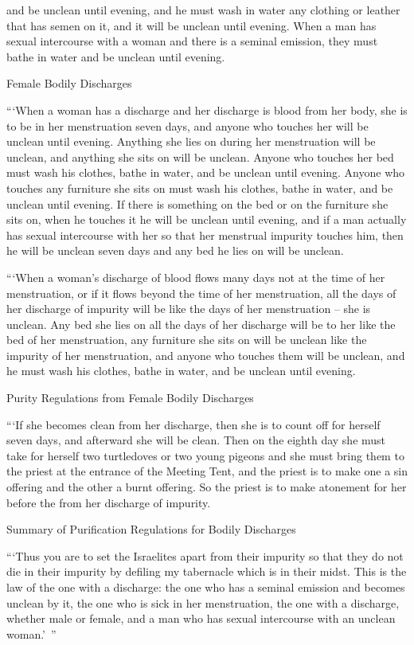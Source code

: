 {and be unclean
until
evening,
and he must wash
in water
any
clothing
or leather
that
has semen
on it,
and it will be unclean
until
evening.
When a man
has sexual intercourse
with
a woman
and there is a seminal
emission,
they must bathe
in water
and be unclean
until
evening.
\par }{\SH Female Bodily Discharges
\par }{\PP {}“‘When
a woman
has a discharge
and her discharge
is blood
from her body,
she is to be
in her menstruation
seven
days,
and anyone
who touches
her will be unclean
until
evening.
Anything
she lies
on
during her menstruation
will be unclean,
and anything
she sits
on
will be unclean.
Anyone
who touches
her bed
must wash
his clothes,
bathe
in water,
and be unclean
until
evening.
Anyone
who touches
any
furniture
she sits
on
must wash
his clothes,
bathe
in water,
and be unclean
until
evening.
If
there is something on
the bed
or
on
the furniture
she
sits
on,
when he touches
it he will be unclean
until
evening,
and if
a man
actually
has sexual
intercourse with
her so that her menstrual
impurity touches him, then
he will be unclean
seven
days
and any
bed
he lies
on
will be unclean.
\par }{\PP {}“‘When
a woman’s
discharge
of blood
flows
many
days
not
at the time
of her menstruation,
or
if
it flows
beyond the time of her menstruation,
all
the days
of her discharge
of impurity
will be like
the days
of her menstruation
– she is
unclean.
Any
bed
she lies
on
all
the days
of her discharge
will be
to her like the bed
of her menstruation,
any
furniture
she sits
on
will be
unclean
like the impurity
of her menstruation,
and anyone
who touches
them will be unclean,
and he must wash
his clothes,
bathe
in water,
and be unclean
until
evening.
\par }{\SH Purity Regulations from Female Bodily Discharges
\par }{\PP {}“‘If
she becomes clean
from her discharge,
then she is to count
off for herself seven
days,
and afterward
she will be clean.
Then on the eighth
day
she must take
for herself two
turtledoves
or
two
young
pigeons
and she must bring
them to
the priest
at
the entrance
of the Meeting
Tent,
and the priest
is to make
one
a sin offering
and the
other
a burnt offering.
So the priest
is to make atonement
for her before
the
{}
from her discharge
of impurity.
\par }{\SH Summary of Purification Regulations for Bodily Discharges
\par }{\PP {}“‘Thus
you are to set the
Israelites
apart from their impurity
so that they do not
die
in their impurity
by defiling
my tabernacle
which
is in their midst.
This
is the law
of the one with a discharge: the one who
has
a seminal
emission
and becomes unclean by it,
the one who is sick
in her menstruation,
the one with
a discharge,
whether male
or female,
and a man
who
has sexual
intercourse with
an unclean woman.’ ”

}
